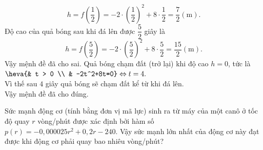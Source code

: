 \begin{ex}
{\begin{itemchoice}
			\[ h=f(\dfrac{1}{2})=-2\cdot \left(\dfrac{1}{2} \right)^2+8\cdot \dfrac{1}{2}=\dfrac{7}{2} (\text{m}).\]
			Độ cao của quả bóng sau khi đá lên được $\dfrac{5}{2}$ giây là 
			\[ h=f\left(\dfrac{5}{2} \right)=-2\cdot \left(\dfrac{5}{2} \right)^2+8\cdot \dfrac{5}{2}=\dfrac{15}{2} (\text{m}).\]
			Vậy mệnh đề đã cho sai.
			\itemch Quả bóng chạm đất (trở lại) khi độ cao $h=0$, tức là $\heva{& t > 0  \\ & -2t^2+8t=0}\Leftrightarrow t=4.$\\
			Vì thế sau $4$ giây quả bóng sẽ chạm đất kể từ khi đá lên.\\
			Vậy mệnh đề đã cho đúng.
		\end{itemchoice}
	}
\end{ex}

\begin{bt}%
	Sức mạnh động cơ (tính bằng đơn vị mã lực) sinh ra từ máy của một canô ở tốc độ quay $r$ vòng/phút được xác định bởi hàm số $p\left( r \right)=-0{,}000025r^2+0{,}2r-240$. Vậy sức mạnh lớn nhất của động cơ này đạt được khi động cơ phải quay bao nhiêu vòng/phút?
\end{bt}

